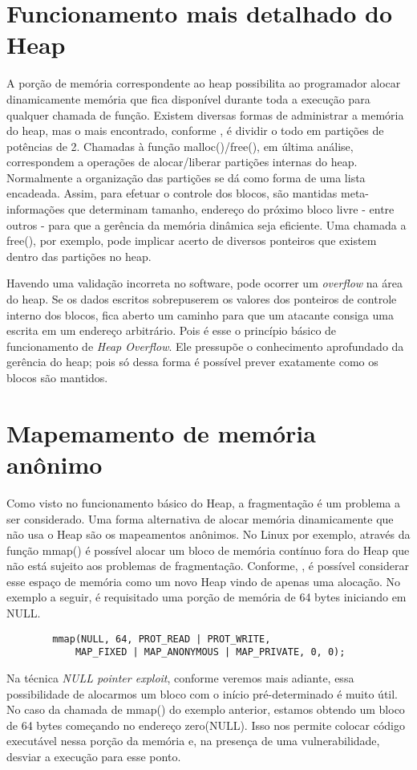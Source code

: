 	\section{Funcionamento mais detalhado do Heap}
	\label{sec:funcionamento_heap}
	A porção de memória correspondente ao heap possibilita ao programador alocar dinamicamente memória
	que fica disponível durante toda a execução para qualquer chamada de função.
	Existem diversas formas de administrar a memória do heap, mas o mais encontrado, conforme
	\cite{Love2007}, é dividir o todo em partições de potências de 2. Chamadas à função malloc()/free(),
	em última análise, correspondem a operações de alocar/liberar partições internas do heap.
	Normalmente a organização das partições se dá como forma de uma lista encadeada.
	Assim, para efetuar o controle dos blocos, são mantidas meta-informações que determinam
	tamanho, endereço do próximo bloco livre - entre outros - para que a gerência
	da memória dinâmica seja eficiente.
	Uma chamada a free(), por exemplo, pode implicar acerto de diversos ponteiros que existem
	dentro das partições no heap.
	 

	Havendo uma validação incorreta no software, pode ocorrer um \textsl{overflow} na área do
	heap. Se os dados escritos sobrepuserem os valores dos ponteiros de controle interno dos blocos,
	fica aberto um caminho para que um atacante consiga uma escrita em um endereço arbitrário.
	Pois é esse o princípio básico de funcionamento de \textsl{Heap Overflow}. Ele pressupõe
	o conhecimento aprofundado da gerência do heap; pois só dessa forma é possível prever
	exatamente como os blocos são mantidos.

	\section{Mapemamento de memória anônimo}
	Como visto no funcionamento básico do Heap, a fragmentação é um problema a ser considerado.
	Uma forma alternativa de alocar memória dinamicamente que não usa o Heap são os mapeamentos anônimos.
	No Linux por exemplo, através da função mmap() é possível alocar um bloco de memória contínuo
	fora do Heap que não está sujeito aos problemas de fragmentação.
	Conforme, \cite{Love2007}, é possível considerar esse espaço de memória como um novo Heap
	vindo de apenas uma alocação.
	No exemplo a seguir, é requisitado uma porção de memória de 64 bytes iniciando em NULL.
	\begin{verbatim}
		mmap(NULL, 64, PROT_READ | PROT_WRITE,
			MAP_FIXED | MAP_ANONYMOUS | MAP_PRIVATE, 0, 0);
	\end{verbatim}
	Na técnica \textsl{NULL pointer exploit}, conforme veremos mais adiante, essa possibilidade
	de alocarmos um bloco com o início pré-determinado é muito útil.
	No caso da chamada de mmap() do exemplo anterior, estamos obtendo um bloco de 64 bytes começando
	no endereço zero(NULL). Isso nos permite colocar código executável nessa porção da memória e,
	na presença de uma vulnerabilidade, desviar a execução para esse ponto.
	
